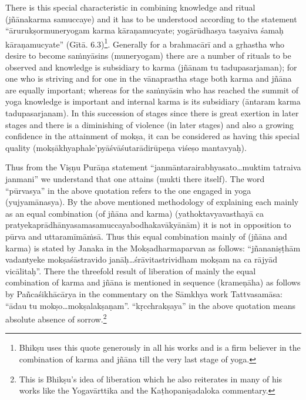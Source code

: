 There is this special characteristic in combining knowledge and ritual (jñānakarma samuccaye) and it has to be understood according to the statement “ārurukṣormuneryogam karma kāraṇamucyate; yogārūdhasya tasyaiva śamaḥ kāraṇamucyate” (Gītā. 6.3)\footnote{Bhikṣu uses this quote generously in all his works and is a firm believer in the combination of karma and jñāna till the very last stage of yoga.}. Generally for a brahmacārī and a gṛhastha who desire to become saṁnyāsins (muneryogam) there are a number of rituals to be observed and knowledge is subsidiary to karma (jñānam tu tadupasarjaman); for one who is striving and for one in the vānaprastha stage both karma and jñāna are equally important; whereas for the saṁnyāsin who has reached the summit of yoga knowledge is important and internal karma is its subsidiary (āntaram karma tadupasarjanam). In this succession of stages since there is great exertion in later stages and there is a diminishing of violence (in later stages) and also a growing confidence in the attainment of mokṣa, it can be considered as having this special quality (mokṣākhyaphale’pyāśvāśutarādirūpeṇa viśeṣo mantavyaḥ).

Thus from the Viṣṇu Purāṇa statement “janmāntarairabhyasato…muk\-tim tatraiva janmani” we understand that one attains (mukti there itself). The word “pūrvasya” in the above quotation refers to the one engaged in yoga (yujyamānasya). By the above mentioned methodology of explaining each mainly as an equal combination (of jñāna and karma) (yathoktavyavasthayā ca pratyekaprādhānyasamasamuccayabodhakavākyānām) it is not in opposition to pūrva and uttaramīmāṁsā. Thus this equal combination mainly of (jñāna and karma) is stated by Janaka in the Mokṣadharmaparvan as follows: “jñananiṣṭhām vadantyeke mokṣaśāstravido janāḥ…śrāvitastrividham mokṣam na ca rājyād vicālitaḥ”. There the threefold result of liberation of mainly the equal combination of karma and jñāna is mentioned in sequence (krameṇāha) as follows by Pañcaśikhācārya in the commentary on the Sāmkhya work Tattvasamāsa: “ādau tu mokṣo…mokṣalakṣaṇam”. “kṛcchrakṣaya” in the above quotation means absolute absence of sorrow.\footnote{This is Bhikṣu’s idea of liberation which he also reiterates in many of his works like the Yogavārttika and the
Kaṭhopaniṣadaloka commentary.}  


